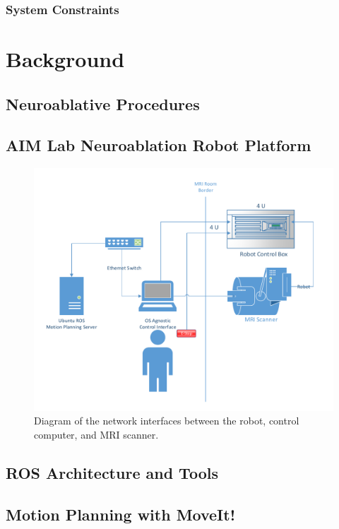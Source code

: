 \documentclass[12pt]{report}
\begin{document}
\subsection{System Constraints}

\chapter{Background}
\section{Neuroablative Procedures}

\section{AIM Lab Neuroablation Robot Platform}

\begin{figure}[thpb]
	\centering
	\includegraphics[width=\textwidth]{diagrams/Networking_Diagram.pdf}
    \caption{Diagram of the network interfaces between the robot, control computer, and MRI scanner. }
    \label{fig:networkDiagram}
\end{figure}

\section{ROS Architecture and Tools}

\section{Motion Planning with MoveIt!}
\end{document}
